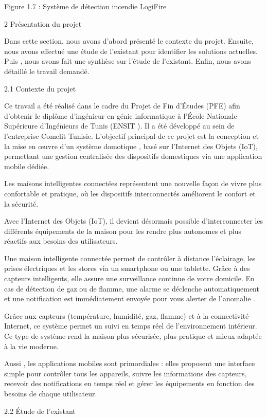 \documentclass{article}
\begin{document}
Figure 1.7 : Système de détection incendie LogiFire

2 Présentation du projet

Dans cette section, nous avons d'abord présenté le contexte du projet. Ensuite, nous avons effectué une étude de l'existant pour identifier les solutions actuelles. Puis , nous avons fait une synthèse  sur l’étude de l’existant. Enfin, nous avons détaillé le travail demandé.

2.1 Contexte du projet

Ce travail a été réalisé dans le cadre du Projet de Fin d'Études (PFE) afin d’obtenir le diplôme d'ingénieur en génie informatique à l'École Nationale Supérieure d'Ingénieurs de Tunis (ENSIT ). Il a été développé au sein de l'entreprise Comelit Tunisie. L'objectif principal de ce projet est la conception et la mise en œuvre d'un système domotique , basé sur  l'Internet des Objets (IoT), permettant une gestion centralisée des dispositifs domestiques via une application mobile dédiée.

Les maisons intelligentes connectées  représentent une nouvelle façon de vivre plus confortable et pratique, où les dispositifs interconnectés améliorent le confort et la sécurité.

Avec l'Internet des Objets (IoT), il devient désormais possible d'interconnecter les différents équipements de la maison pour les rendre plus autonomes et plus réactifs aux besoins des utilisateurs.

Une maison intelligente connectée  permet de contrôler à distance l’éclairage, les prises électriques et les stores via un smartphone ou une tablette. Grâce à des capteurs intelligents, elle assure une surveillance continue de votre domicile. En cas de détection de gaz ou de flamme, une alarme se déclenche automatiquement et une notification est immédiatement envoyée pour vous alerter de l’anomalie .

Grâce aux capteurs (température, humidité, gaz, flamme) et à la connectivité Internet, ce système permet un suivi en temps réel de l'environnement intérieur. Ce type de système rend la maison plus sécurisée, plus pratique et mieux adaptée à la vie moderne.

Aussi , les applications mobiles sont primordiales : elles proposent une interface simple pour contrôler tous les appareils, suivre les informations des capteurs, recevoir des notifications en temps réel et gérer les équipements en fonction des besoins de chaque utilisateur.

2.2 Étude de l’existant
\end{document}
